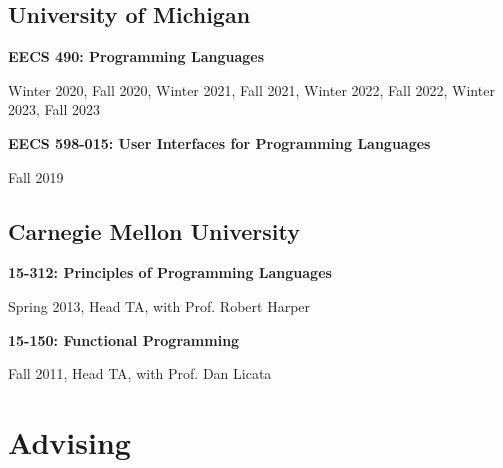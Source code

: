 \documentclass[10pt,letterpaper]{article}
\renewenvironment{itemize}{
  \begin{list}{}{
    \setlength{\leftmargin}{1.25em}
    \setlength{\itemsep}{0.25em}
    \setlength{\parskip}{0pt}
    \setlength{\parsep}{0.2em}
  }
}{
  \end{list}
}
\begin{document}
\subsection*{University of Michigan}
\begin{itemize}
  \item \textbf{EECS 490: Programming Languages}
        \begin{itemize}
          \item Winter 2020, Fall 2020, Winter 2021, Fall 2021, Winter 2022, Fall 2022, Winter 2023, Fall 2023
        \end{itemize}
  \item \textbf{EECS 598-015: User Interfaces for Programming Languages}
        \begin{itemize}
          \item Fall 2019
        \end{itemize}
\end{itemize}

\subsection*{Carnegie Mellon University}
\begin{itemize}
  \item \textbf{15-312: Principles of Programming Languages}
        \begin{itemize}
          \item Spring 2013, Head TA, with Prof. Robert Harper
        \end{itemize}
  \item \textbf{15-150: Functional Programming}
        \begin{itemize}
          \item Fall 2011, Head TA, with Prof. Dan Licata
        \end{itemize}
\end{itemize}


\section*{Advising}
\end{document}
